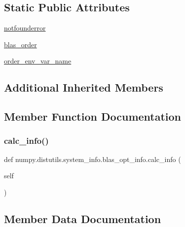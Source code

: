 \subsection*{Static Public Attributes}
\begin{DoxyCompactItemize}
\item 
\hyperlink{classnumpy_1_1distutils_1_1system__info_1_1blas__opt__info_a2d860bbf13ff70f10fde3f2696d64b7e}{notfounderror}
\item 
\hyperlink{classnumpy_1_1distutils_1_1system__info_1_1blas__opt__info_a01d602e6987e549dcba3b18a1c44aa1e}{blas\+\_\+order}
\item 
\hyperlink{classnumpy_1_1distutils_1_1system__info_1_1blas__opt__info_a79329542209897c23fdf269e08c29d60}{order\+\_\+env\+\_\+var\+\_\+name}
\end{DoxyCompactItemize}
\subsection*{Additional Inherited Members}


\subsection{Member Function Documentation}
\mbox{\label{classnumpy_1_1distutils_1_1system__info_1_1blas__opt__info_a748d878ac9b4a36c9f5385615742f94a}} 
\subsubsection{\texorpdfstring{calc\+\_\+info()}{calc\_info()}}
{\footnotesize\ttfamily def numpy.\+distutils.\+system\+\_\+info.\+blas\+\_\+opt\+\_\+info.\+calc\+\_\+info (\begin{DoxyParamCaption}\item[{}]{self }\end{DoxyParamCaption})}



\subsection{Member Data Documentation}
\mbox{\label{classnumpy_1_1distutils_1_1system__info_1_1blas__opt__info_a01d602e6987e549dcba3b18a1c44aa1e}} 
